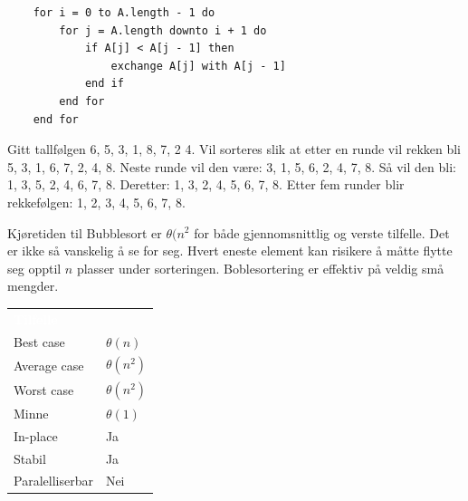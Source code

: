 \begin{lstlisting}
    for i = 0 to A.length - 1 do
    	for j = A.length downto i + 1 do
		    if A[j] < A[j - 1] then
		    	exchange A[j] with A[j - 1]
		    end if
	    end for
    end for
\end{lstlisting}

\begin{boxed}
Gitt tallfølgen 6, 5, 3, 1, 8, 7, 2 4. Vil sorteres slik at etter en runde vil rekken bli 5, 3, 1, 6, 7, 2, 4, 8. Neste runde vil den være: 3, 1, 5, 6, 2, 4, 7, 8. Så vil den bli: 1, 3, 5, 2, 4, 6, 7, 8. Deretter: 1, 3, 2, 4, 5, 6, 7, 8. Etter fem runder blir rekkefølgen: 1, 2, 3, 4, 5, 6, 7, 8.
\end{boxed}

\noindent Kjøretiden til Bubblesort er \textbf{$\theta(n^2$} for både gjennomsnittlig og verste tilfelle. Det er ikke så vanskelig å se for seg. Hvert eneste element kan risikere å måtte flytte seg opptil $n$ plasser under sorteringen. Boblesortering er effektiv på veldig små mengder.

\begin{table}[H]
    \label{tab:bubblesort}
    \centering
    \begin{tabular}{|L{15em} | L{15em}|}
        \hline
        \textbf{\textcolor{white}{Tilfelle}} & \textbf{\textcolor{white}{}}\\
        Best case & $\theta(n)$\\
        Average case & $\theta(n^2)$\\
        Worst case & $\theta(n^2)$\\
        Minne & $\theta(1)$\\
        In-place & Ja\\
        Stabil & Ja\\
        Paralelliserbar & Nei\\
         \hline
    \end{tabular}
\end{table}

